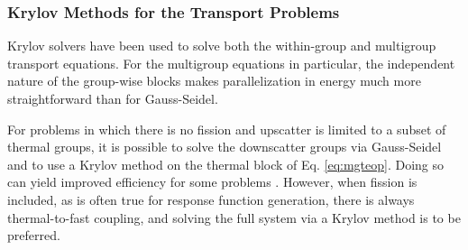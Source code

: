 \subsubsection{Krylov Methods for the Transport Problems}

Krylov solvers have been used 
to solve both the within-group \cite{warsa2004kim} and multigroup
\cite{evans2010tdf} transport equations.  For the multigroup 
equations in particular, the independent nature of the group-wise 
blocks makes parallelization in energy much more straightforward
than for Gauss-Seidel.

For problems in which there is no fission and 
upscatter is limited to a subset of thermal groups, it is
possible to solve the downscatter groups via Gauss-Seidel
and to use a Krylov method on the thermal block of Eq. \ref{eq:mgteop}.
Doing so can yield improved efficiency for some problems \cite{evans2010tdf}.  
However, when fission is included, as is often true for response 
function generation, there is always
thermal-to-fast coupling, and solving the full system via
a Krylov method is to be preferred.

